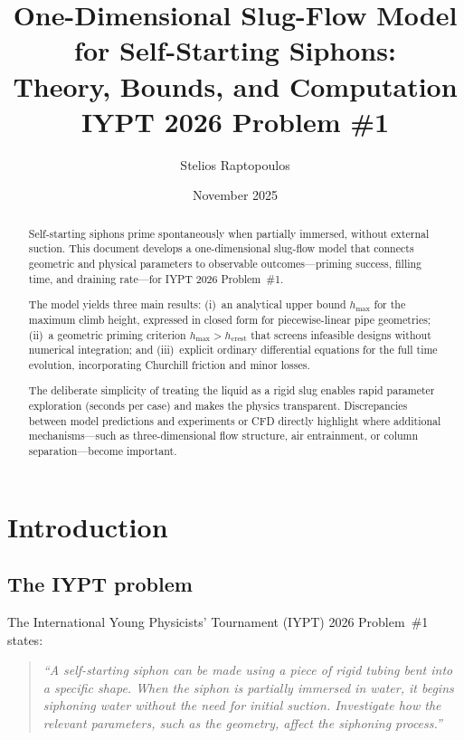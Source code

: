 \documentclass[11pt]{article}
\title{One-Dimensional Slug-Flow Model for Self-Starting Siphons:\\
       Theory, Bounds, and Computation\\[0.5em]
       \large IYPT 2026 Problem \#1}
\author{Stelios Raptopoulos}
\date{November 2025}
\theoremstyle{definition}
\begin{document}
\maketitle

\begin{abstract}
Self-starting siphons prime spontaneously when partially immersed, without external suction. 
This document develops a one-dimensional slug-flow model that connects geometric and physical 
parameters to observable outcomes---priming success, filling time, and draining rate---for 
IYPT 2026 Problem~\#1.

The model yields three main results: (i)~an analytical upper bound $h_{\max}$ for the maximum 
climb height, expressed in closed form for piecewise-linear pipe geometries; (ii)~a geometric 
priming criterion $h_{\max} > h_{\text{crest}}$ that screens infeasible designs without 
numerical integration; and (iii)~explicit ordinary differential equations for the full 
time evolution, incorporating Churchill friction and minor losses.

The deliberate simplicity of treating the liquid as a rigid slug enables rapid parameter 
exploration (seconds per case) and makes the physics transparent. Discrepancies between 
model predictions and experiments or CFD directly highlight where additional mechanisms---such 
as three-dimensional flow structure, air entrainment, or column separation---become important.
\end{abstract}

\tableofcontents
\newpage

\section{Introduction}
\label{sec:intro}

\subsection{The IYPT problem}

The International Young Physicists' Tournament (IYPT) 2026 Problem~\#1 states:
\begin{quote}
\emph{``A self-starting siphon can be made using a piece of rigid tubing bent into a specific 
shape. When the siphon is partially immersed in water, it begins siphoning water without the 
need for initial suction. Investigate how the relevant parameters, such as the geometry, 
affect the siphoning process.''}
\end{quote}
\end{document}
